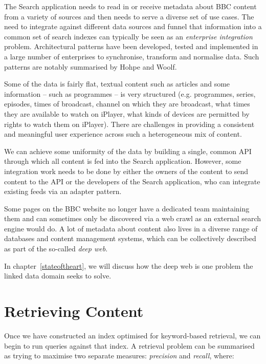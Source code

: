 \documentclass[10pt,a4paper]{report}
\begin{document}
The Search application needs to read in or receive metadata about
BBC content from a variety of sources and then needs to serve
a diverse set of use cases.\cite{fenning2014applicability} The
need to integrate against different data sources and funnel
that information into a common set of search indexes can
typically be seen as an \emph{enterprise integration}
problem. Architectural patterns have been developed, tested and
implemented in a large number of enterprises to synchronise,
transform and normalise data. Such patterns are notably
summarised by Hohpe and Woolf.\cite{hohpe2004enterprise}

Some of the data is fairly flat, textual content such as articles and some
information -- such as programmes -- is very structured (e.g. programmes,
series, episodes, times of broadcast, channel on which they are broadcast,
what times they are available to watch on iPlayer, what kinds of devices
are permitted by rights to watch them on iPlayer). There are challenges
in providing a consistent and meaningful user experience across such
a heterogeneous mix of content.

We can achieve some uniformity of the data by building a single, common
API through which all content is fed into the Search application. However,
some integration work needs to be
done by either the owners of the content to send content to the API
or the developers of the Search application, who can integrate
existing feeds via an adapter pattern.

Some pages on the BBC website no
longer have a dedicated team maintaining them and can sometimes only
be discovered via a web crawl as an external search engine would do. A lot
of metadata about content also lives in a diverse range of databases and
content management systems, which can be collectively described as part
of the so-called \emph{deep web}.\cite{}

In chapter~\ref{stateoftheart}, we will discuss how the deep web is one
problem the linked data domain seeks to solve.

\section{Retrieving Content}

Once we have constructed an index optimised for keyword-based retrieval,
we can begin to run queries against that index. A retrieval problem
can be summarised as trying to maximise two separate measures: \emph{precision}
and \emph{recall}, where:
\end{document}
